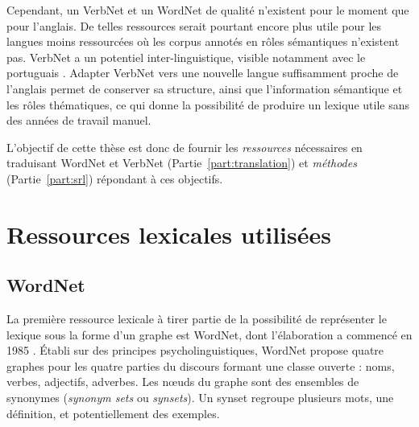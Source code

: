 
Cependant, un VerbNet et un WordNet de qualité n'existent pour le moment que
pour l'anglais. De telles ressources serait pourtant encore plus utile pour les
langues moins ressourcées où les corpus annotés en rôles sémantiques n'existent
pas. VerbNet a un potentiel inter-linguistique, visible notamment avec le
portuguais \citep[section 2.2.2]{kipperschuler2005verbnet}. Adapter VerbNet
vers une nouvelle langue suffisamment proche de l'anglais permet de conserver
sa structure, ainsi que l'information sémantique et les rôles thématiques, ce
qui donne la possibilité de produire un lexique utile sans des années de
travail manuel.


L'objectif de cette thèse est donc de fournir les \emph{ressources} nécessaires
en traduisant WordNet et VerbNet (Partie~\ref{part:translation}) et
\emph{méthodes} (Partie~\ref{part:srl}) répondant à ces objectifs.

\section{Ressources lexicales utilisées}

\subsection{WordNet}
\label{presentation_wordnet}

La première ressource lexicale à tirer partie de la possibilité de représenter
le lexique sous la forme d'un graphe est WordNet, dont l'élaboration a commencé
en 1985 \citep{miller1990introduction}. Établi sur des principes
psycholinguistiques, WordNet propose quatre graphes pour les quatre parties du
discours formant une classe ouverte : noms, verbes, adjectifs, adverbes. Les
nœuds du graphe sont des ensembles de synonymes (\emph{synonym sets} ou
\emph{synsets}). Un synset regroupe plusieurs mots, une définition, et
potentiellement des exemples.

